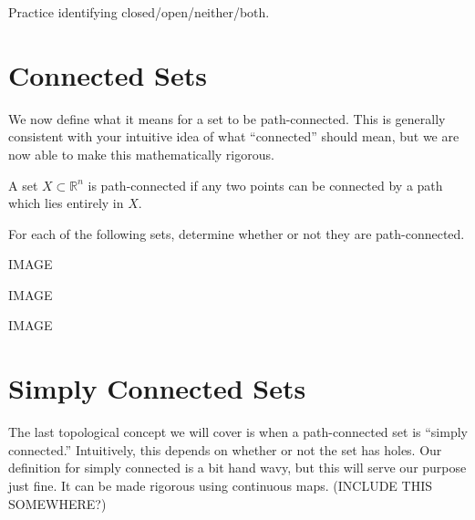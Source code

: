 \documentclass{ximera}
\begin{document}
\begin{example}
\begin{foldable}
Practice identifying closed/open/neither/both.
\end{foldable}
\end{example}

\section{Connected Sets}

We now define what it means for a set to be path-connected. This is generally consistent with your intuitive idea of what ``connected'' should mean, but we are now able to make this mathematically rigorous.

\begin{definition}
A set $X\subset \mathbb{R}^n$ is path-connected if any two points can be connected by a path which lies entirely in $X$.
\end{definition}

\begin{example}
\begin{foldable}
For each of the following sets, determine whether or not they are path-connected.

IMAGE
\begin{multipleChoice}
\end{multipleChoice}

IMAGE
\begin{multipleChoice}
\end{multipleChoice}

IMAGE
\begin{multipleChoice}
\end{multipleChoice}
\end{foldable}
\end{example}

\section{Simply Connected Sets}

The last topological concept we will cover is when a path-connected set is ``simply connected.'' Intuitively, this depends on whether or not the set has holes. Our definition for simply connected is a bit hand wavy, but this will serve our purpose just fine. It can be made rigorous using continuous maps. (INCLUDE THIS SOMEWHERE?)
\end{document}
